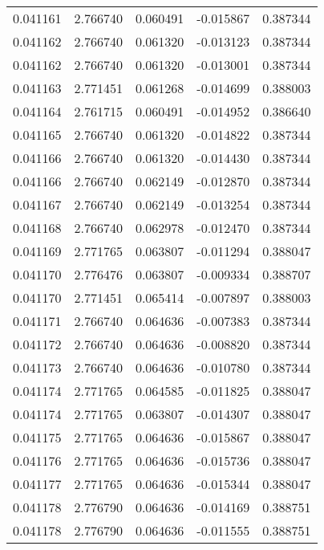 \begin{tabular}{lrrrr}
0.041161    &  2.766740 &  0.060491 & -0.015867 &             0.387344 \\
0.041162    &  2.766740 &  0.061320 & -0.013123 &             0.387344 \\
0.041162    &  2.766740 &  0.061320 & -0.013001 &             0.387344 \\
0.041163    &  2.771451 &  0.061268 & -0.014699 &             0.388003 \\
0.041164    &  2.761715 &  0.060491 & -0.014952 &             0.386640 \\
0.041165    &  2.766740 &  0.061320 & -0.014822 &             0.387344 \\
0.041166    &  2.766740 &  0.061320 & -0.014430 &             0.387344 \\
0.041166    &  2.766740 &  0.062149 & -0.012870 &             0.387344 \\
0.041167    &  2.766740 &  0.062149 & -0.013254 &             0.387344 \\
0.041168    &  2.766740 &  0.062978 & -0.012470 &             0.387344 \\
0.041169    &  2.771765 &  0.063807 & -0.011294 &             0.388047 \\
0.041170    &  2.776476 &  0.063807 & -0.009334 &             0.388707 \\
0.041170    &  2.771451 &  0.065414 & -0.007897 &             0.388003 \\
0.041171    &  2.766740 &  0.064636 & -0.007383 &             0.387344 \\
0.041172    &  2.766740 &  0.064636 & -0.008820 &             0.387344 \\
0.041173    &  2.766740 &  0.064636 & -0.010780 &             0.387344 \\
0.041174    &  2.771765 &  0.064585 & -0.011825 &             0.388047 \\
0.041174    &  2.771765 &  0.063807 & -0.014307 &             0.388047 \\
0.041175    &  2.771765 &  0.064636 & -0.015867 &             0.388047 \\
0.041176    &  2.771765 &  0.064636 & -0.015736 &             0.388047 \\
0.041177    &  2.771765 &  0.064636 & -0.015344 &             0.388047 \\
0.041178    &  2.776790 &  0.064636 & -0.014169 &             0.388751 \\
0.041178    &  2.776790 &  0.064636 & -0.011555 &             0.388751 \\

\end{tabular}
